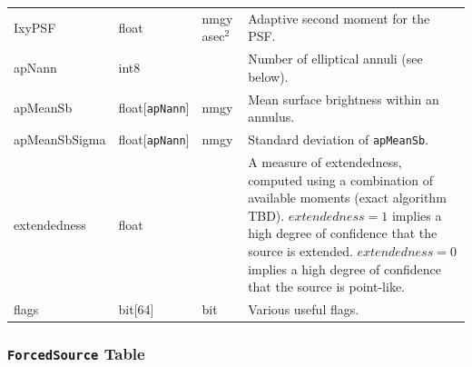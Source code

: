 \documentclass[12pt]{article}
\newcommand{\code}[1]{\texttt{#1}}
\newcommand{\ForcedSource}{\code{ForcedSource}\xspace}
\begin{document}
\begin{center}
\begin{longtable}{p{3cm}p{2cm}p{2cm}p{5cm}}
IxyPSF & float & nmgy asec$^{2}$ & Adaptive second moment for the PSF. \\

apNann & int8 & ~ & Number of elliptical annuli (see below). \\

apMeanSb & float[{\tt apNann}] & nmgy & Mean surface brightness within an annulus. \\

apMeanSbSigma & float[{\tt apNann}] & nmgy & Standard deviation of {\tt apMeanSb}. \\

extendedness & float & ~ & A measure of extendedness, computed using a combination of available moments
(exact algorithm TBD). $extendedness=1$ implies a high degree of confidence that the source is extended. $extendedness=0$ implies a high degree of confidence that the source is point-like. \\

flags & bit[64] & bit & Various useful flags. \\ \hline
\end{longtable}
\end{center}





\subsubsection{\ForcedSource Table}
\label{sec:forcedSourceTable}
\end{document}
